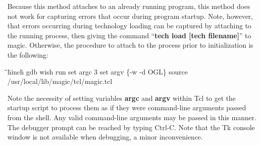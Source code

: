 \documentclass[letterpaper,twoside,12pt]{article}
\def\hinch{\hspace*{0.5in}}
\def\starti{\begin{center}\begin{tabbing}\hinch\=\hinch\=
	\hinch\=hinch\hinch\=\kill}
\def\endi{\end{tabbing}\end{center}}
\def\ii{\>\>\>}
\begin{document}
Because this method attaches to an already running program, this method
does not work for capturing errors that occur during program startup.
Note, however, that errors occurring during technology loading can be
captured by attaching to the running process, then giving the command
``{\bfseries tech load [tech filename]}'' to magic.  Otherwise, the
procedure to attach to the process prior to initialization is the
following:

\starti
  \ii gdb wish
  \ii run
  \ii set argc 3
  \ii set argv \{-w -d OGL\}
  \ii source /usr/local/lib/magic/tcl/magic.tcl
\endi

Note the necessity of setting variables {\bfseries argc} and {\bfseries
argv} within Tcl to get the startup script to process them as if they
were command-line arguments passed from the shell.  Any valid command-line
arguments may be passed in this manner.  The debugger prompt can be reached
by typing Ctrl-C.  Note that the Tk console window is not available when
debugging, a minor inconvenience.
\end{document}
